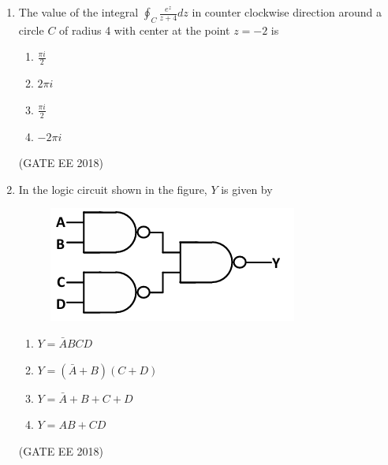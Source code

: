 \documentclass[journal,12pt,onecolumn]{IEEEtran}
\theoremstyle{remark}
\begin{document}
\begin{enumerate}
    \item The value of the integral $\oint_{C} \frac{e^{z}}{z+4} dz$ in counter clockwise direction around a circle $C$ of radius 4 with center at the point $z = -2$ is
    \begin{multicols}{4}
    \begin{enumerate}
        \item $\frac{\pi i}{2}$
        \item $2\pi i$
        \item $\frac{\pi i}{2}$
        \item $-2\pi i$
    \end{enumerate}
    \end{multicols}
    \hfill{(GATE EE 2018)}

    \item In the logic circuit shown in the figure, $Y$ is given by
    \begin{figure}[H]
    \centering
    \includegraphics[]{figs/Q.14.png}
    \caption{}
    \label{fig:4}
\end{figure}
    \begin{multicols}{2}
    \begin{enumerate}
        \item $Y = \bar{A} B C D$
        \item $Y = (\bar{A} + B)(C + D)$
        \item $Y = \bar{A} + B + C + D$
        \item $Y = AB + CD$
    \end{enumerate}
    \end{multicols}
    \hfill{(GATE EE 2018)}


\end{enumerate}
\end{document}
